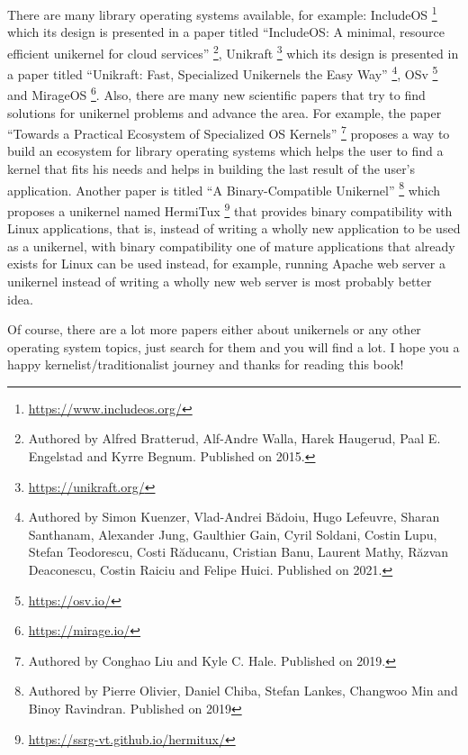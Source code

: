 There are many library operating systems available, for example:
IncludeOS \footnote{\url{https://www.includeos.org/}} which its design
is presented in a paper titled ``IncludeOS: A minimal, resource
efficient unikernel for cloud services'' \footnote{Authored by Alfred
  Bratterud, Alf-Andre Walla, Harek Haugerud, Paal E. Engelstad and
  Kyrre Begnum. Published on 2015.}, Unikraft \footnote{\url{https://unikraft.org/}}
which its design is presented in a paper titled ``Unikraft: Fast,
Specialized Unikernels the Easy Way'' \footnote{Authored by Simon
  Kuenzer, Vlad-Andrei Bădoiu, Hugo Lefeuvre, Sharan Santhanam,
  Alexander Jung, Gaulthier Gain, Cyril Soldani, Costin Lupu, Stefan
  Teodorescu, Costi Răducanu, Cristian Banu, Laurent Mathy, Răzvan
  Deaconescu, Costin Raiciu and Felipe Huici. Published on 2021.}, OSv
\footnote{\url{https://osv.io/}} and MirageOS \footnote{\url{https://mirage.io/}}.
Also, there are many new scientific papers that try to find solutions
for unikernel problems and advance the area. For example, the paper
``Towards a Practical Ecosystem of Specialized OS Kernels'' \footnote{Authored
  by Conghao Liu and Kyle C. Hale. Published on 2019.} proposes a way to
build an ecosystem for library operating systems which helps the user to
find a kernel that fits his needs and helps in building the last result
of the user's application. Another paper is titled ``A Binary-Compatible
Unikernel'' \footnote{Authored by Pierre Olivier, Daniel Chiba, Stefan
  Lankes, Changwoo Min and Binoy Ravindran. Published on 2019} which
proposes a unikernel named HermiTux \footnote{\url{https://ssrg-vt.github.io/hermitux/}}
that provides binary compatibility with Linux applications, that is,
instead of writing a wholly new application to be used as a unikernel,
with binary compatibility one of mature applications that already exists
for Linux can be used instead, for example, running Apache web server a
unikernel instead of writing a wholly new web server is most probably
better idea.

Of course, there are a lot more papers either about unikernels or any
other operating system topics, just search for them and you will find a
lot. I hope you a happy kernelist/traditionalist journey and thanks for
reading this book!
